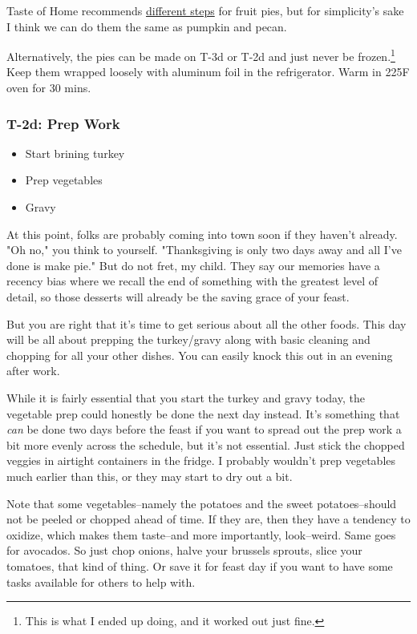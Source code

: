 \documentclass[12pt]{article}
\begin{document}
	Taste of Home recommends \href{https://www.tasteofhome.com/article/how-to-freeze-a-pie/}{different steps} for fruit pies, but for simplicity's sake I think we can do them the same as pumpkin and pecan.
	
	Alternatively, the pies can be made on T-3d or T-2d and just never be frozen.\footnote{This is what I ended up doing, and it worked out just fine.} Keep them wrapped loosely with aluminum foil in the refrigerator. Warm in 225F oven for 30 mins.
	
	\subsubsection{T-2d: Prep Work}
	\begin{itemize}
		\item Start brining turkey
		\item Prep vegetables
		\item Gravy
	\end{itemize}
	
	At this point, folks are probably coming into town soon if they haven't already. "Oh no," you think to yourself. "Thanksgiving is only two days away and all I've done is make pie." But do not fret, my child. They say our memories have a recency bias where we recall the end of something with the greatest level of detail, so those desserts will already be the saving grace of your feast.
	
	But you are right that it's time to get serious about all the other foods. This day will be all about prepping the turkey/gravy along with basic cleaning and chopping for all your other dishes. You can easily knock this out in an evening after work.
	
	While it is fairly essential that you start the turkey and gravy today, the vegetable prep could honestly be done the next day instead. It's something that \textit{can} be done two days before the feast if you want to spread out the prep work a bit more evenly across the schedule, but it's not essential. Just stick the chopped veggies in airtight containers in the fridge. I probably wouldn't prep vegetables much earlier than this, or they may start to dry out a bit.
	
	Note that some vegetables--namely the potatoes and the sweet potatoes--should not be peeled or chopped ahead of time. If they are, then they have a tendency to oxidize, which makes them taste--and more importantly, look--weird. Same goes for avocados. So just chop onions, halve your brussels sprouts, slice your tomatoes, that kind of thing. Or save it for feast day if you want to have some tasks available for others to help with.
	
\end{document}
